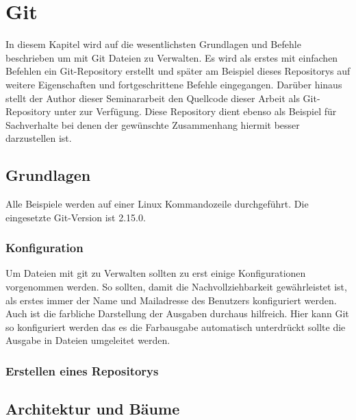 \chapter{Git}\label{cha:Git}
In diesem Kapitel wird auf die wesentlichsten Grundlagen und Befehle
beschrieben um mit Git Dateien zu Verwalten. Es wird als erstes mit einfachen
Befehlen ein Git-Repository erstellt und später am Beispiel dieses Repositorys
auf weitere Eigenschaften und fortgeschrittene Befehle eingegangen. Darüber
hinaus stellt der Author dieser Seminararbeit den Quellcode dieser Arbeit als
Git-Repository unter \cite{link:seminararbeit} zur Verfügung. Diese Repository
dient ebenso als Beispiel für Sachverhalte bei denen der gewünschte
Zusammenhang hiermit besser darzustellen ist. 

\section{Grundlagen}\label{gitbasics}

Alle Beispiele werden auf einer Linux Kommandozeile durchgeführt. Die
eingesetzte Git-Version ist 2.15.0.



\subsection{Konfiguration}\label{gitconfig}
Um Dateien mit git zu Verwalten sollten zu erst einige Konfigurationen
vorgenommen werden. So sollten, damit die Nachvollziehbarkeit gewährleistet
ist, als erstes immer der Name und Mailadresse des Benutzers konfiguriert
werden. Auch ist die farbliche Darstellung der Ausgaben durchaus hilfreich.
Hier kann Git so konfiguriert werden das es die Farbausgabe automatisch
unterdrückt sollte die Ausgabe in Dateien umgeleitet werden.



\subsection{Erstellen eines Repositorys}\label{startup}


\section{Architektur und Bäume}\label{sec:trees}
\label{sec:Konfiguration}
